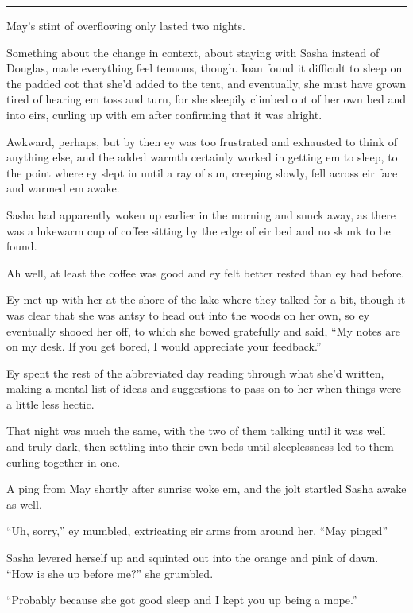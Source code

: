 \begin{center}\rule{0.5\linewidth}{0.5pt}\end{center}

May's stint of overflowing only lasted two nights.

Something about the change in context, about staying with Sasha instead of Douglas, made everything feel tenuous, though. Ioan found it difficult to sleep on the padded cot that she'd added to the tent, and eventually, she must have grown tired of hearing em toss and turn, for she sleepily climbed out of her own bed and into eirs, curling up with em after confirming that it was alright.

Awkward, perhaps, but by then ey was too frustrated and exhausted to think of anything else, and the added warmth certainly worked in getting em to sleep, to the point where ey slept in until a ray of sun, creeping slowly, fell across eir face and warmed em awake.

Sasha had apparently woken up earlier in the morning and snuck away, as there was a lukewarm cup of coffee sitting by the edge of eir bed and no skunk to be found.

Ah well, at least the coffee was good and ey felt better rested than ey had before.

Ey met up with her at the shore of the lake where they talked for a bit, though it was clear that she was antsy to head out into the woods on her own, so ey eventually shooed her off, to which she bowed gratefully and said, ``My notes are on my desk. If you get bored, I would appreciate your feedback.''

Ey spent the rest of the abbreviated day reading through what she'd written, making a mental list of ideas and suggestions to pass on to her when things were a little less hectic.

That night was much the same, with the two of them talking until it was well and truly dark, then settling into their own beds until sleeplessness led to them curling together in one.

A ping from May shortly after sunrise woke em, and the jolt startled Sasha awake as well.

``Uh, sorry,'' ey mumbled, extricating eir arms from around her. ``May pinged''

Sasha levered herself up and squinted out into the orange and pink of dawn. ``How is she up before me?'' she grumbled.

``Probably because she got good sleep and I kept you up being a mope.''

